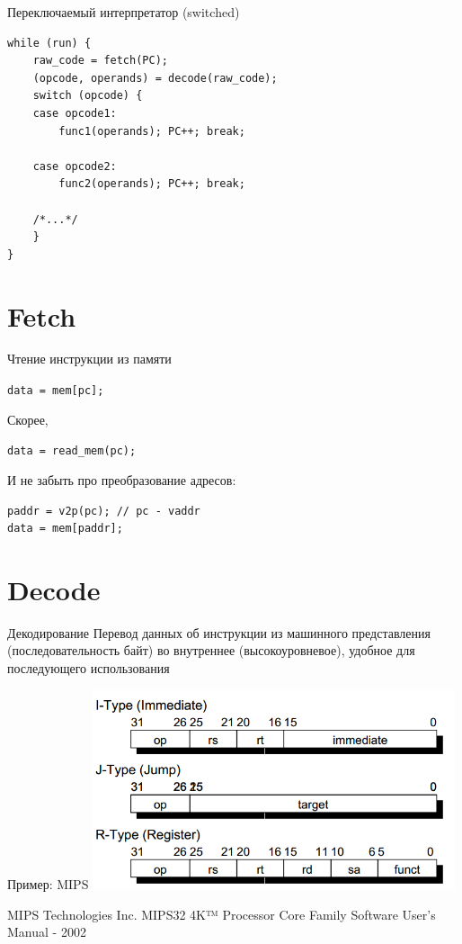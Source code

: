 \documentclass{beamer}
\begin{document}
\begin{frame}[fragile]{Переключаемый интерпретатор (switched)}
\begin{verbatim}
while (run) {
    raw_code = fetch(PC);
    (opcode, operands) = decode(raw_code);
    switch (opcode) {
    case opcode1:
        func1(operands); PC++; break;

    case opcode2:
        func2(operands); PC++; break;

    /*...*/
    }
}
\end{verbatim}
\end{frame}


\section{Fetch}

\begin{frame}[fragile]{Чтение инструкции из памяти}

\texttt{data = mem[pc];}\pause

Скорее,

\texttt{data = read_mem(pc);}\pause

И не забыть про преобразование адресов:

\begin{verbatim}
paddr = v2p(pc); // pc - vaddr
data = mem[paddr];
\end{verbatim}

\end{frame}

\section{Decode}

\begin{frame}{Декодирование}
Перевод данных об инструкции из машинного представления (последовательность байт) во внутреннее (высокоуровневое), удобное для последующего использования
\end{frame}

\begin{frame}{Пример: MIPS}
\centering
\includegraphics[width=0.8\textwidth]{./mips-formats}

\tiny{MIPS Technologies Inc. MIPS32 4K™ Processor Core Family Software User’s Manual - 2002}
\end{frame}
\end{document}
